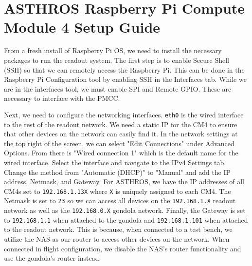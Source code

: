 \chapter{ASTHROS Raspberry Pi Compute Module 4 Setup Guide}
\label{readout/app:cm4_setup}
From a fresh install of Raspberry Pi OS, we need to install the necessary packages to run the readout system.
The first step is to enable Secure Shell (SSH) so that we can remotely access the Raspberry Pi.
This can be done in the Raspberry Pi Configuration tool by enabling SSH in the Interfaces tab.
While we are in the interfaces tool, we must enable SPI and Remote GPIO. 
These are necessary to interface with the PMCC.

Next, we need to configure the networking interfaces. 
\texttt{eth0} is the wired interface to the rest of the readout network. 
We need a static IP for the CM4 to ensure that other devices on the network can easily find it.
In the network settings at the top right of the screen, we can select "Edit Connections" under Advanced Options. 
From there is "Wired connection 1" which is the default name for the wired interface.
Select the interface and navigate to the IPv4 Settings tab.
Change the method from "Automatic (DHCP)" to "Manual" and add the IP address, Netmask, and Gateway.
For ASTHROS, we have the IP addresses of all CM4s set to \texttt{192.168.1.13X} where \texttt{X} is uniquely assigned to each CM4.
The Netmask is set to \texttt{23} so we can access all devices on the \texttt{192.168.1.X} readout network as well as the \texttt{192.168.0.X} gondola network.
Finally, the Gateway is set to \texttt{192.168.1.1} when attached to the gondola and \texttt{192.168.1.101} when attached to the readout network.
This is because, when connected to a test bench, we utilize the NAS as our router to access other devices on the network.
When connected in flight configuration, we disable the NAS's router functionality and use the gondola's router instead.

